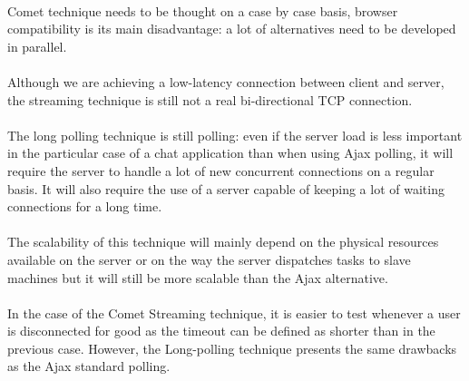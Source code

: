 \paragraph{} Comet technique needs to be thought on a case by case basis, 
browser compatibility is its main disadvantage: a lot of alternatives need to 
be developed in parallel.

\paragraph{} Although we are achieving a low-latency connection between 
client and server, the streaming technique is still not a real bi-directional 
TCP connection.

\paragraph{} The long polling technique is still polling: even if the server 
load is less important in the particular case of a chat application than when 
using Ajax polling, it will require the 
server to handle a lot of new concurrent connections on a regular basis. It 
will also require the use of a server capable of keeping a lot of waiting 
connections for a long time.

\paragraph{} The scalability of this technique will mainly depend on the 
physical resources available on the server or on the way the server dispatches 
tasks to slave machines but it will still be more scalable than the Ajax 
alternative.

\paragraph{} In the case of the Comet Streaming technique, it is easier to test 
whenever a user is disconnected for good as the timeout can be defined as 
shorter than in the previous case. However, the Long-polling technique presents 
the same drawbacks as the Ajax standard polling.